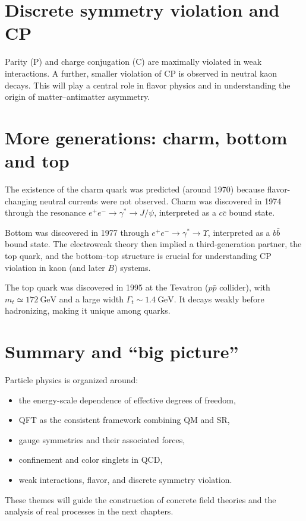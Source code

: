 \section{Discrete symmetry violation and CP}
Parity (P) and charge conjugation (C) are maximally violated in weak interactions.
A further, smaller violation of CP is observed in neutral kaon decays. This will play a central
role in flavor physics and in understanding the origin of matter--antimatter asymmetry.

\section{More generations: charm, bottom and top}
The existence of the charm quark was predicted (around 1970) because flavor-changing neutral
currents were not observed. Charm was discovered in 1974 through the resonance
$e^+e^-\to \gamma^\ast \to J/\psi$, interpreted as a $c\bar c$ bound state.

Bottom was discovered in 1977 through $e^+e^-\to \gamma^\ast\to \Upsilon$, interpreted as a
$b\bar b$ bound state. The electroweak theory then implied a third-generation partner, the top quark,
and the bottom--top structure is crucial for understanding CP violation in kaon (and later $B$) systems.

The top quark was discovered in 1995 at the Tevatron ($p\bar p$ collider), with $m_t\simeq 172~\text{GeV}$
and a large width $\Gamma_t\sim 1.4~\text{GeV}$. It decays weakly before hadronizing, making it unique among quarks.

\section{Summary and ``big picture''}
Particle physics is organized around:
\begin{itemize}
  \item the energy-scale dependence of effective degrees of freedom,
  \item QFT as the consistent framework combining QM and SR,
  \item gauge symmetries and their associated forces,
  \item confinement and color singlets in QCD,
  \item weak interactions, flavor, and discrete symmetry violation.
\end{itemize}
These themes will guide the construction of concrete field theories and the analysis of real processes
in the next chapters.